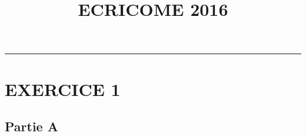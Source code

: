 \documentclass[11pt]{article}%
\title{\bf \vspace{-1.6cm} ECRICOME 2016} %
\author{} %
\date{} %
\begin{document}
\maketitle %
\vspace{-1.2cm}\hrule %
\thispagestyle{fancy}

\vspace*{.4cm}


\section*{EXERCICE 1}

\subsection*{Partie A}
\end{document}

